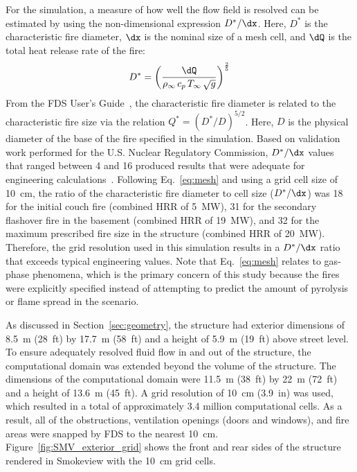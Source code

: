 \documentclass[12pt,oneside]{book}
\begin{document}
For the simulation, a measure of how well the flow field is resolved can be estimated by using the non-dimensional expression $D^*/\dx$. Here, $D^*$ is the characteristic fire diameter, $\dx$ is the nominal size of a mesh cell, and $\dQ$ is the total heat release rate of the fire:
\begin{equation}
D^* = \left(
     \frac{\dQ}{\rho_\infty \, c_p \, T_\infty \, \sqrt{g}}
     \right)^\frac{2}{5}
\label{eq:mesh}
\end{equation}
From the FDS User's Guide~\cite{FDS_Users_Guide}, the characteristic fire diameter is related to the characteristic fire size via the relation $Q^* = (D^*/D)^{5/2}$. Here, $D$ is the physical diameter of the base of the fire specified in the simulation. Based on validation work performed for the U.S. Nuclear Regulatory Commission, $D^*/\dx$ values that ranged between 4 and 16 produced results that were adequate for engineering calculations~\cite{NUREG_1824}. Following Eq.~\ref{eq:mesh} and using a grid cell size of 10~cm, the ratio of the characteristic fire diameter to cell size ($D^*/\dx$) was 18 for the initial couch fire (combined HRR of 5~MW), 31 for the secondary flashover fire in the basement (combined HRR of 19~MW), and 32 for the maximum prescribed fire size in the structure (combined HRR of 20~MW). Therefore, the grid resolution used in this simulation results in a $D^*/\dx$ ratio that exceeds typical engineering values. Note that Eq.~\ref{eq:mesh} relates to gas-phase phenomena, which is the primary concern of this study because the fires were explicitly specified instead of attempting to predict the amount of pyrolysis or flame spread in the scenario.

As discussed in Section~\ref{sec:geometry}, the structure had exterior dimensions of 8.5~m (28~ft) by 17.7~m (58~ft) and a height of 5.9~m (19~ft) above street level. To ensure adequately resolved fluid flow in and out of the structure, the computational domain was extended beyond the volume of the structure. The dimensions of the computational domain were 11.5~m (38~ft) by 22~m (72~ft) and a height of 13.6~m (45~ft). A grid resolution of 10~cm (3.9~in) was used, which resulted in a total of approximately 3.4 million computational cells. As a result, all of the obstructions, ventilation openings (doors and windows), and fire areas were snapped by FDS to the nearest 10~cm. Figure~\ref{fig:SMV_exterior_grid} shows the front and rear sides of the structure rendered in Smokeview with the 10~cm grid cells.


\clearpage
\end{document}
